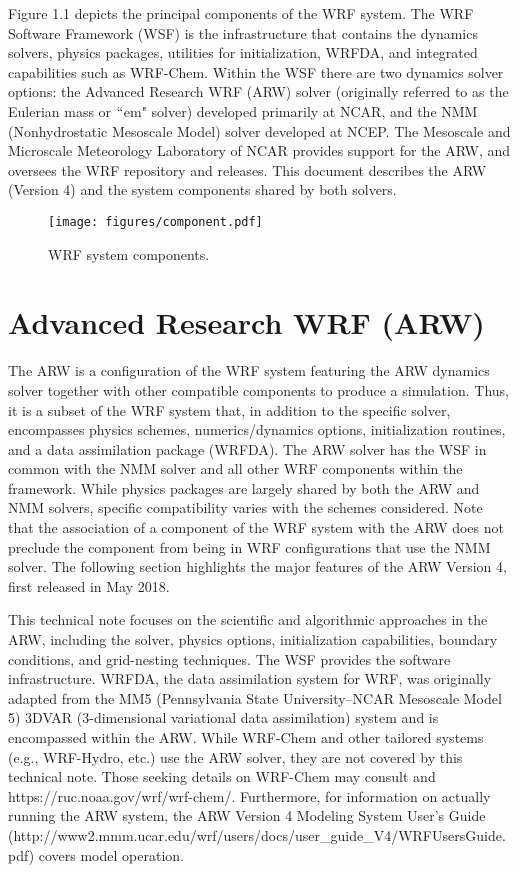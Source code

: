 Figure 1.1 depicts the principal components of the WRF system. 
The WRF Software Framework (WSF) is the infrastructure 
that contains the dynamics solvers, physics packages, utilities
for initialization, WRFDA, and integrated capabilities such as WRF-Chem.  
Within the WSF there are two dynamics solver options: the 
Advanced Research WRF (ARW) solver (originally referred to
as the Eulerian mass or $``$em" solver) developed primarily at NCAR, and
the NMM (Nonhydrostatic Mesoscale Model) solver developed at NCEP.
The Mesoscale and Microscale Meteorology Laboratory of NCAR provides
support for the ARW, and oversees the WRF repository and releases.
This document describes the ARW (Version 4) and the system components 
shared by both solvers.


%
%
\begin{figure}
  \centering
  \texttt{[image: figures/component.pdf]}
  \caption{\label{figure:1}WRF system components.}
\end{figure}

\section {Advanced Research WRF (ARW)}

The ARW is a configuration of the WRF system featuring
the ARW dynamics solver together with other compatible components 
to produce a simulation.  Thus, 
it is a subset of the WRF system that, in addition to the specific solver, 
encompasses physics schemes, numerics/dynamics options, 
initialization routines, and a data assimilation package (WRFDA).  
The ARW solver has the WSF in common with the NMM solver and all other 
WRF components within the framework.  While physics packages are 
largely shared by both the ARW and NMM solvers, specific 
compatibility varies with the schemes considered.  
Note that the association of a component of the WRF system with 
the ARW does not preclude the component from being in
WRF configurations that use the NMM solver.  
The following section highlights the major features of the 
ARW Version 4, first released in May 2018.

This technical note focuses on the scientific and algorithmic 
approaches in the ARW, including the solver, physics options,
initialization capabilities, boundary conditions, and grid-nesting techniques.  
The WSF provides the software infrastructure.  
WRFDA, the data assimilation system for WRF, was  
originally adapted from the MM5 
(Pennsylvania State University--NCAR Mesoscale Model 5) 
3DVAR (3-dimensional variational data assimilation) system 
\citep{barker04} and is encompassed within the ARW.
While WRF-Chem and other tailored systems 
(e.g., WRF-Hydro, etc.) use the ARW solver, they are 
not covered by this technical note.  Those seeking details on 
WRF-Chem may consult \citet{Grelletal05} and 
https://ruc.noaa.gov/wrf/wrf-chem/.  Furthermore, for information on 
actually running the ARW system, the ARW Version 4 Modeling System User's Guide 
(http://www2.mmm.ucar.edu/wrf/users/docs/user_guide_V4/WRFUsersGuide.pdf) 
covers model operation. 

